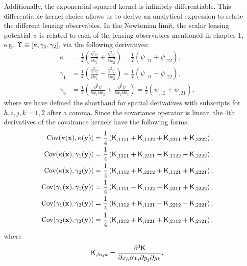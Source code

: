 Additionally, the exponential squared kernel is infinitely differentiable. This
differentiable kernel choice allows us to derive an analytical expression to
relate the different lensing observables.  
In the Newtonian limit, the scalar lensing potential $\psi$ is related to 
each of the lensing observables mentioned in chapter 1, e.g. 
$\Upsilon \equiv [\kappa, \gamma_1, \gamma_2]$, via the following derivatives:
\begin{align}
\kappa &= \frac{1}{2}\left(\frac{\partial^2 \psi}{\partial x_1^2} +
\frac{\partial^2 \psi}{\partial x_2^2 }\right) 
= \frac{1}{2} (\psi_{,11} + \psi_{,22}),\\ 
\gamma_1 
&=\frac{1}{2}\left(\frac{\partial^2 \psi}{\partial x_1^2} - 
\frac{\partial^2 \psi}{\partial x_2^2}\right) 
= \frac{1}{2} (\psi_{,11} - \psi_{,22}), \\
\gamma_2 
&=\frac{1}{2}\left(\frac{\partial^2 \psi}{\partial x_1 \partial
x_2} + \frac{\partial^2 \psi}{\partial x_2 \partial x_1}\right)
= \frac{1}{2} (\psi_{,12} + \psi_{,21}), 
\end{align}
where we have defined the shorthand for spatial derivatives with
subscripts for $h,i,j,k = 1, 2$ after a comma.
Since the covariance operator is linear, the 4th derivatives of the covairance
kernels have the following forms: 
\begin{align}
	\label{eq:kernel_derivatives1}
	\mathrm{Cov} (\kappa(\mathbf{x}), \kappa(\mathbf{y}))
&= \frac{1}{4}\left(
\mathsf{K}_{,1111} + \mathsf{K}_{,1122} + \mathsf{K}_{,2211} + \mathsf{K}_{,2222}
\right), \\
\mathrm{Cov}(\kappa(\mathbf{x}), \gamma_1(\mathbf{y})) &= \frac{1}{4}\left(
\mathsf{K}_{,1111} + \mathsf{K}_{,2211} - \mathsf{K}_{,1122} - \mathsf{K}_{,2222}
\right), \\
\mathrm{Cov}(\kappa(\mathbf{x}), \gamma_2(\mathbf{y})) &= \frac{1}{4}\left(
\mathsf{K}_{,1112} + \mathsf{K}_{,2212} + \mathsf{K}_{,1121} + \mathsf{K}_{,2221}
\right),\\
\mathrm{Cov}(\gamma_1(\mathbf{x}), \gamma_1(\mathbf{y})) &= \frac{1}{4}\left(
\mathsf{K}_{,1111} - \mathsf{K}_{,1122} - \mathsf{K}_{,2211} + \mathsf{K}_{,2222}
\right), \\
\mathrm{Cov}(\gamma_1(\mathbf{x}), \gamma_2(\mathbf{y})) &= \frac{1}{4}\left(
\mathsf{K}_{,1112} + \mathsf{K}_{,1121} - \mathsf{K}_{,2212} - \mathsf{K}_{,2221}
\right), \\
\mathrm{Cov}(\gamma_2(\mathbf{x}), \gamma_2(\mathbf{y})) &= \frac{1}{4}\left(
\mathsf{K}_{,1212} + \mathsf{K}_{,1221} + \mathsf{K}_{,2112} + \mathsf{K}_{,2121}
\right),
	\label{eq:kernel_derivatives2}
\end{align}
where
\begin{equation}
	\mathsf{K}_{,hijk} = \frac{\partial^4 \mathsf{K}}{\partial x_h \partial x_i
	\partial y_j \partial y_k}.
\end{equation}

